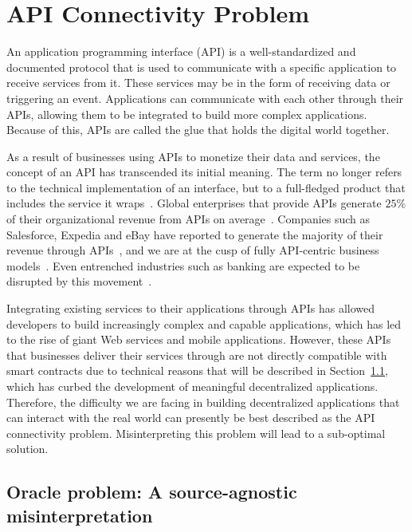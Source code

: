 \documentclass[11pt]{article}
\begin{document}
\section{API Connectivity Problem}
\label{sec:api-connectivity-problem}

An application programming interface (API) is a well-standardized and documented protocol that is used to communicate with a specific application to receive services from it.
These services may be in the form of receiving data or triggering an event.
Applications can communicate with each other through their APIs, allowing them to be integrated to build more complex applications.
Because of this, APIs are called the glue that holds the digital world together.

As a result of businesses using APIs to monetize their data and services, the concept of an API has transcended its initial meaning.
The term no longer refers to the technical implementation of an interface, but to a full-fledged product that includes the service it wraps~\cite{deloitte:2015}.
Global enterprises that provide APIs generate $25\%$ of their organizational revenue from APIs on average~\cite{mulesoft:2019}.
Companies such as Salesforce, Expedia and eBay have reported to generate the majority of their revenue through APIs~\cite{iyer:2015}, and we are at the cusp of fully API-centric business models~\cite{ibm:2016}.
Even entrenched industries such as banking are expected to be disrupted by this movement~\cite{capgemini:2019a}.

Integrating existing services to their applications through APIs has allowed developers to build increasingly complex and capable applications, which has led to the rise of giant Web services and mobile applications.
However, these APIs that businesses deliver their services through are not directly compatible with smart contracts due to technical reasons that will be described in Section~\ref{sec:oracle-problem-a-misnomer}, which has curbed the development of meaningful decentralized applications.
Therefore, the difficulty we are facing in building decentralized applications that can interact with the real world can presently be best described as the API connectivity problem.
Misinterpreting this problem will lead to a sub-optimal solution.

\subsection{Oracle problem: A source-agnostic misinterpretation}
\label{sec:oracle-problem-a-misnomer}
\end{document}

